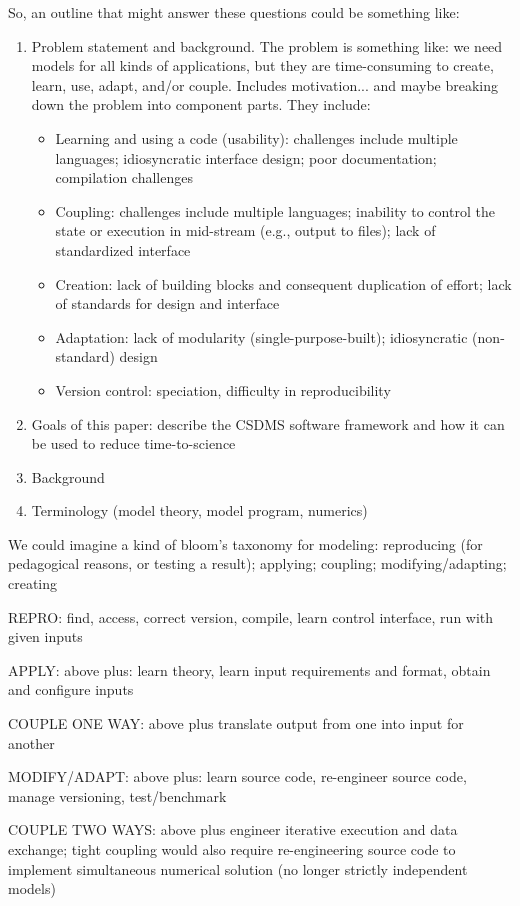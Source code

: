 \documentclass[12pt]{amsart}
\begin{document}
So, an outline that might answer these questions could be something like:
\begin{enumerate}
\item Problem statement and background. The problem is something like: we need models for all kinds of applications, but they are time-consuming to create, learn, use, adapt, and/or couple. Includes motivation... and maybe breaking down the problem into component parts. They include:
  \begin{itemize}
  \item Learning and using a code (usability): challenges include multiple languages; idiosyncratic interface design; poor documentation; compilation challenges
  \item Coupling: challenges include multiple languages; inability to control the state or execution in mid-stream (e.g., output to files); lack of standardized interface
  \item Creation: lack of building blocks and consequent duplication of effort; lack of standards for design and interface
  \item Adaptation: lack of modularity (single-purpose-built); idiosyncratic (non-standard) design
  \item Version control: speciation, difficulty in reproducibility
  \end{itemize}
\item Goals of this paper: describe the CSDMS software framework and how it can be used to reduce time-to-science
\item Background
\item Terminology (model theory, model program, numerics)

\end{enumerate}

We could imagine a kind of bloom's taxonomy for modeling: reproducing (for pedagogical reasons, or testing a result); applying; coupling; modifying/adapting; creating

REPRO: find, access, correct version, compile, learn control interface, run with given inputs

APPLY: above plus: learn theory, learn input requirements and format, obtain and configure inputs

COUPLE ONE WAY: above plus translate output from one into input for another

MODIFY/ADAPT: above plus: learn source code, re-engineer source code, manage versioning, test/benchmark

COUPLE TWO WAYS: above plus engineer iterative execution and data exchange; tight coupling would also require re-engineering source code to implement simultaneous numerical solution (no longer strictly independent models)
\end{document}
